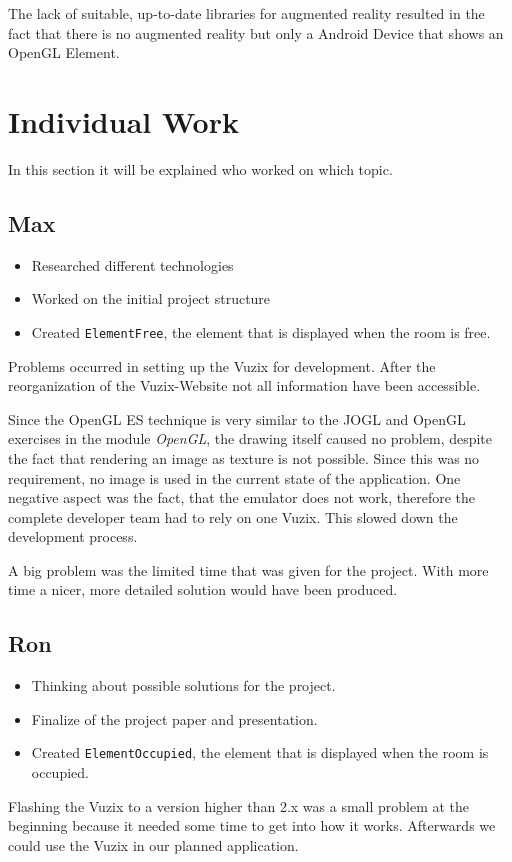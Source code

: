\documentclass[11pt]{scrartcl}
\begin{document}
\begin{multicols}{2}
		The lack of suitable, up-to-date libraries for augmented reality resulted in the fact that there is no augmented reality but only a Android Device that shows an OpenGL Element.  

	\section{Individual Work}
		In this section it will be explained who worked on which topic.
		\subsection{Max}
			\begin{itemize}
				\item Researched different technologies
				\item Worked on the initial project structure
				\item Created \texttt{ElementFree}, the element that is displayed when the room is free.
			\end{itemize}
			 Problems occurred in setting up the Vuzix for development. After the reorganization of the Vuzix-Website not all information have been accessible.
			 
			 Since the OpenGL ES technique is very similar to the JOGL and OpenGL exercises in the module \emph{OpenGL}, the drawing itself caused no problem, despite the fact that rendering an image as texture is not possible. Since this was no requirement, no image is used in the current state of the application.  One negative aspect was the fact, that the emulator does not work, therefore the complete developer team had to rely on one Vuzix. This slowed down the development process.
			 
			 A big problem was the limited time that was given for the project.  With more time a nicer, more detailed solution would have been produced.
		\subsection{Ron}
			\begin{itemize}
				\item Thinking about possible solutions for the project.
				\item Finalize of the project paper and presentation.
				\item Created \texttt{ElementOccupied}, the element that is displayed when the room is occupied.
			\end{itemize}
			Flashing the Vuzix to a version higher than 2.x was a small problem at the beginning because it needed some time to get into how it works. Afterwards we could use the Vuzix in our planned application.
			

\end{multicols}
\end{document}
